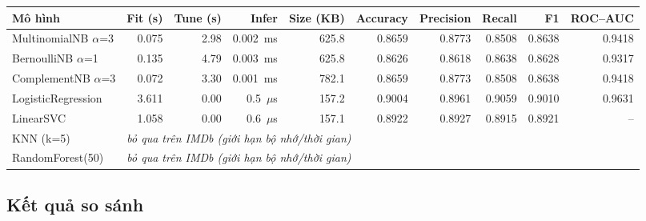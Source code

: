 \documentclass[11pt,a4paper]{article}
\begin{document}
\begin{table}[H]
\centering
\small
\label{tab:bench-imdb}
\footnotesize
\setlength{\tabcolsep}{3.5pt}
\begin{tabular}{@{}lrrrrrrrrr@{}}
\toprule
\textbf{Mô hình} & \textbf{Fit (s)} & \textbf{Tune (s)} & \textbf{Infer} & \textbf{Size (KB)} & \textbf{Accuracy} & \textbf{Precision} & \textbf{Recall} & \textbf{F1} & \textbf{ROC--AUC} \\
\midrule
MultinomialNB $\alpha$=3 & 0.075 & 2.98 & 0.002~ms & 625.8 & 0.8659 & 0.8773 & 0.8508 & 0.8638 & 0.9418 \\
BernoulliNB $\alpha$=1 & 0.135 & 4.79 & 0.003~ms & 625.8 & 0.8626 & 0.8618 & 0.8638 & 0.8628 & 0.9317 \\
ComplementNB $\alpha$=3 & 0.072 & 3.30 & 0.001~ms & 782.1 & 0.8659 & 0.8773 & 0.8508 & 0.8638 & 0.9418 \\
LogisticRegression & 3.611 & 0.00 & 0.5~$\mu$s & 157.2 & 0.9004 & 0.8961 & 0.9059 & 0.9010 & 0.9631 \\
LinearSVC & 1.058 & 0.00 & 0.6~$\mu$s & 157.1 & 0.8922 & 0.8927 & 0.8915 & 0.8921 & -- \\
KNN (k=5) & \multicolumn{9}{l}{\emph{bỏ qua trên IMDb (giới hạn bộ nhớ/thời gian)}} \\
RandomForest(50) & \multicolumn{9}{l}{\emph{bỏ qua trên IMDb (giới hạn bộ nhớ/thời gian)}} \\
\bottomrule
\end{tabular}
\end{table}

\subsection{Kết quả so sánh}
\end{document}
